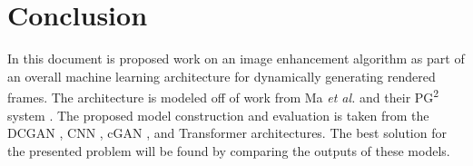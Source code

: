 \documentclass[letterpaper]{article} %
\begin{document}
\section{Conclusion}
\label{sec:conclusion}
In this document is proposed work on an image enhancement algorithm as
part of an overall machine learning architecture for dynamically
generating rendered frames. The architecture is modeled off of work from
Ma \textit{et al.} and their PG\textsuperscript{2} system
\cite{pose_guided_image_generation}.
The proposed model construction and evaluation is taken from
the DCGAN \cite{unsupervised_learning},
CNN \cite{pixelcnn++},
cGAN \cite{image_to_image},
and Transformer \cite{generative_transformers} architectures.
The best solution for the presented problem will be found
by comparing the outputs of these models.

\nocite{pixel_recurrent}
\nocite{parallel_density}
\nocite{pixel_snail}
\nocite{pixel_subscale}



\end{document}
